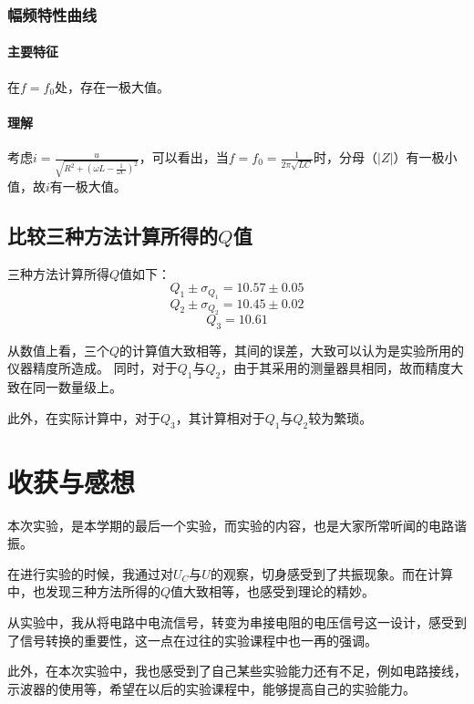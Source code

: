 \documentclass{ctexart}
\begin{document}
  \subsubsection{幅频特性曲线}
  \paragraph{主要特征}在$f=f_0$处，存在一极大值。
  \paragraph{理解}考虑$i = \frac {u}{\sqrt{R^2+(\omega L-\frac{1}{\omega C})^2}}$，可以看出，当$f=f_0=\frac{1}{2\pi\sqrt{LC}}$时，分母（$|Z|$）有一极小值，故$i$有一极大值。
\subsection{比较三种方法计算所得的$Q$值}
三种方法计算所得$Q$值如下：
$$Q_1\pm\sigma_{Q_1}=10.57\pm0.05$$
$$Q_2\pm\sigma_{Q_2}=10.45\pm0.02$$
$$Q_3=10.61$$

从数值上看，三个$Q$的计算值大致相等，其间的误差，大致可以认为是实验所用的仪器精度所造成。
同时，对于$Q_1$与$Q_2$，由于其采用的测量器具相同，故而精度大致在同一数量级上。

此外，在实际计算中，对于$Q_3$，其计算相对于$Q_1$与$Q_2$较为繁琐。
      \section{收获与感想}
      本次实验，是本学期的最后一个实验，而实验的内容，也是大家所常听闻的电路谐振。

      在进行实验的时候，我通过对$U_C$与$U$的观察，切身感受到了共振现象。而在计算中，也发现三种方法所得的$Q$值大致相等，也感受到理论的精妙。

      从实验中，我从将电路中电流信号，转变为串接电阻的电压信号这一设计，感受到了信号转换的重要性，这一点在过往的实验课程中也一再的强调。

      此外，在本次实验中，我也感受到了自己某些实验能力还有不足，例如电路接线，示波器的使用等，希望在以后的实验课程中，能够提高自己的实验能力。
\end{document}
